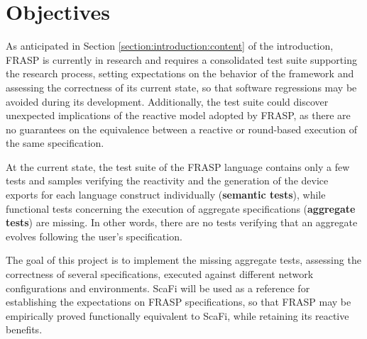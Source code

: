 
\section{Objectives}
\label{section:analysis:objectives}

As anticipated in Section \ref{section:introduction:content} of the
introduction, FRASP is currently in research and requires a consolidated test
suite supporting the research process, setting expectations on the behavior of
the framework and assessing the correctness of its current state, so that
software regressions may be avoided during its development. Additionally, the
test suite could discover unexpected implications of the reactive model adopted
by FRASP, as there are no guarantees on the equivalence between a reactive or
round-based execution of the same specification.

At the current state, the test suite of the FRASP language contains only a few
tests and samples verifying the reactivity and the generation of the device
exports for each language construct individually (\textbf{semantic tests}),
while functional tests concerning the execution of aggregate specifications
(\textbf{aggregate tests}) are missing. In other words, there are no tests
verifying that an aggregate evolves following the user's specification.

The goal of this project is to implement the missing aggregate tests, assessing
the correctness of several specifications, executed against different network
configurations and environments. \ac{ScaFi} will be used as a reference for
establishing the expectations on FRASP specifications, so that FRASP may be
empirically proved functionally equivalent to \ac{ScaFi}, while retaining its
reactive benefits.
